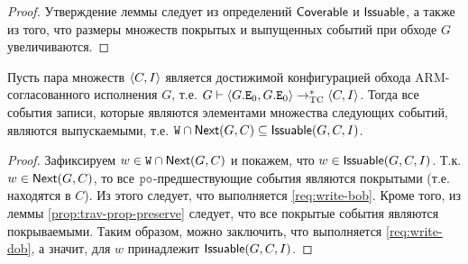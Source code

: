 \begin{proof}
  Утверждение леммы следует из определений ${\sf Coverable}$ и ${\sf Issuable}$, а также из того, что размеры множеств покрытых и выпущенных событий при обходе $G$ увеличиваются.
\end{proof}
\begin{lemma}
  \label{prop:next-write}
  Пусть пара множеств ${\langle{C, I}\rangle}$ является достижимой конфигурацией обхода
  ARM-согласованного исполнения $G$, т.е.
  $G \vdash {\langle{G.{\mathtt{E}}_0, G.{\mathtt{E}}_0}\rangle} \rightarrow_{\rm TC}^{*} {\langle{C, I}\rangle}$.
  Тогда все события записи, которые являются элементами множества следующих событий,
  являются выпускаемыми,
  т.е. ${\mathtt{W}} \cap {\sf Next}(G, C) \subseteq {\sf Issuable}(G,C,I)$.
\end{lemma}
\begin{proof}
  Зафиксируем $w \in {\mathtt{W}} \cap {\sf Next}(G, C)$ и покажем, что $w \in {\sf Issuable}(G, C, I)$.
  Т.к. $w \in {\sf Next}(G, C)$, то все $\lPO$-предшествующие события являются покрытыми (т.е.
  находятся в $C$). Из этого следует, что выполняется \ref{req:write-bob}. Кроме того, из леммы
  \ref{prop:trav-prop-preserve} следует, что все покрытые события являются покрываемыми. Таким образом, можно заключить, что выполняется 
  \ref{req:write-dob}, а значит, для $w$ принадлежит ${\sf Issuable}(G, C, I)$.
\end{proof}
